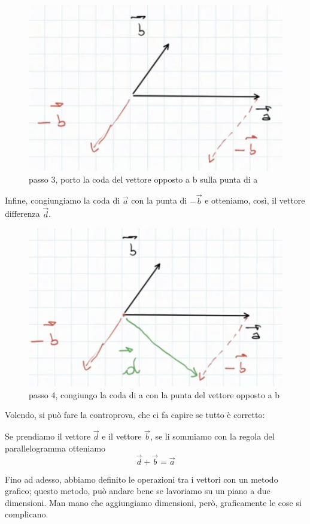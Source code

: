 \documentclass[a4paper]{book}
\begin{document}
\begin{figure}[h]
\begin{center}
\includegraphics[width = 0.5 \textwidth]{differenza3}
\caption{passo 3, porto la coda del vettore opposto a b sulla punta di a}
\label{fig:differenza3}
\end{center}
\end{figure}

Infine, congiungiamo la coda di $ \overrightarrow{a} $ con la punta di $- \overrightarrow{b}$ e otteniamo, così, il vettore differenza $\overrightarrow{d} $.

\begin{figure}[h]
\begin{center}
\includegraphics[width = 0.5 \textwidth]{differenza4}
\caption{passo 4, congiungo la coda di a con la punta del vettore opposto a b}
\label{fig:differenza4}
\end{center}
\end{figure}

Volendo, si può fare la controprova, che ci fa capire se tutto è corretto:

Se prendiamo il vettore $ \overrightarrow{d} $ e il vettore $\overrightarrow{b}$, se li sommiamo con la regola del parallelogramma otteniamo
$$ \overrightarrow{d} + \overrightarrow{b} = \overrightarrow{a} $$

Fino ad adesso, abbiamo definito le operazioni tra i vettori con un metodo grafico; questo metodo, può andare bene se lavoriamo su un piano a due dimensioni. Man mano che aggiungiamo dimensioni, però, graficamente le cose si complicano.

\newpage
\end{document}
